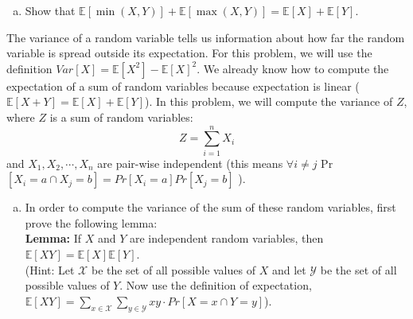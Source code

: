 \documentclass[]{article}
\newif\ifsolutions
\renewcommand{\answer}[1]{{\color{mydarkblue}\textbf{Solution:}#1}}
\def \exx {\mathbb{E}}
\begin{document}
\begin{qunlist}
\begin{enumerate}[a)]
\qpart
\item Show that $\mathbb{E}[\min(X,Y)] + \mathbb{E}[\max(X,Y)]  = \mathbb{E}[X] + \mathbb{E}[Y]$.

\ifsolutions{ \answer { We know the following facts without proof.
\[ \min(X,Y)=X, \max(X,Y)=Y \quad\text{if } X < Y\]
\[ \min(X,Y)=Y, \max(X,Y)=X \quad\text{if } X \geq Y\]
So, we have
\begin{align*}
\mathbb{E}[\min(X,Y)] + \mathbb{E}[\max(X,Y)] & =  \mathbb{E}[\min(X,Y) + \max(X,Y)] &  \text{by linearity of expectation} \\ 
& = \mathbb{E}[X + Y] & \text{by the above lemma}\\ 
& = \mathbb{E}[X] + \mathbb{E}[Y] & \text{by linearity of expectation}
\end{align*}

}}
\fi


\end{enumerate}

\newpage



The variance of a random variable tells us information about how far the random variable is spread outside its expectation. For this problem, we will use the definition $Var[X] = \exx[X^2] - \exx[X]^2$.  We already know how to compute the expectation of a sum of random variables because expectation is linear ($\mathbb{E}[X+Y] = \mathbb{E}[X] + \mathbb{E}[Y]$). In this problem, we will compute the variance of $Z$, where $Z$ is a sum of random variables:
\[ Z = \sum_{i=1}^n X_i \]
and $X_1, X_2, \cdots, X_n$ are pair-wise independent (this means $\forall{i \neq} j $ Pr$[X_i = a \cap X_j = b] = Pr[X_i = a]Pr[X_j = b]$ ).
\begin{enumerate}[a)]
\qpart
\item In order to compute the variance of the sum of these random variables, first  prove the following lemma: \\ \textbf{Lemma:} If $X$ and $Y$ are independent random variables, then $\exx[XY] = \exx[X] \exx[Y]$. \\  
(Hint: Let $\mathcal{X}$ be the set of all possible values of $X$ and let $\mathcal{Y}$ be the set of all possible values of $Y$. Now use the definition of expectation, $\exx[XY] = \sum\limits_{x \in \mathcal{X}} \sum\limits_{y \in \mathcal{Y}} xy \cdot Pr[X=x \cap Y = y]$).


\end{enumerate}
\end{qunlist}
\end{document}
